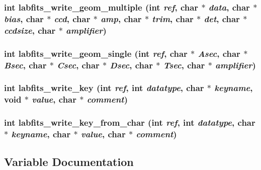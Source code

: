 \subsubsection{\setlength{\rightskip}{0pt plus 5cm}int labfits\_\-write\_\-geom\_\-multiple (int {\em ref}, char $\ast$ {\em data}, char $\ast$ {\em bias}, char $\ast$ {\em ccd}, char $\ast$ {\em amp}, char $\ast$ {\em trim}, char $\ast$ {\em det}, char $\ast$ {\em ccdsize}, char $\ast$ {\em amplifier})}\label{GfitsLib_8c_6563a390fbbcea56f234cd25115b10b9}


\subsubsection{\setlength{\rightskip}{0pt plus 5cm}int labfits\_\-write\_\-geom\_\-single (int {\em ref}, char $\ast$ {\em Asec}, char $\ast$ {\em Bsec}, char $\ast$ {\em Csec}, char $\ast$ {\em Dsec}, char $\ast$ {\em Tsec}, char $\ast$ {\em amplifier})}\label{GfitsLib_8c_d21d4ad7f9aeb2aefaf2df1e1374b62d}


\subsubsection{\setlength{\rightskip}{0pt plus 5cm}int labfits\_\-write\_\-key (int {\em ref}, int {\em datatype}, char $\ast$ {\em keyname}, void $\ast$ {\em value}, char $\ast$ {\em comment})}\label{GfitsLib_8c_bb452811fc8900cca1dd5f3c396e20a7}


\subsubsection{\setlength{\rightskip}{0pt plus 5cm}int labfits\_\-write\_\-key\_\-from\_\-char (int {\em ref}, int {\em datatype}, char $\ast$ {\em keyname}, char $\ast$ {\em value}, char $\ast$ {\em comment})}\label{GfitsLib_8c_b5d62d67f1e987cf38076f2790cc117f}




\subsection{Variable Documentation}
